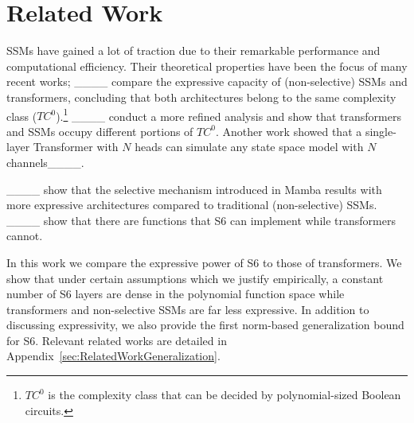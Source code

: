 \section{Related Work}
\vspace{-3pt}
SSMs have gained a lot of traction due to their remarkable performance and computational efficiency. Their theoretical properties have been the focus of many recent works; ____ compare the expressive capacity of (non-selective) SSMs and transformers, concluding that both architectures belong to the same complexity class ($TC^0$).\footnote{$TC^0$ is the complexity class that can be decided by polynomial-sized Boolean circuits.} ____ conduct a more refined analysis and show that transformers and SSMs occupy different portions of $TC^0$. Another work showed that a single-layer Transformer with $N$ heads can simulate any state space model with $N$ channels____. 
 

____ show that the selective mechanism introduced in Mamba results with more expressive architectures compared to traditional (non-selective) SSMs.
____ show that there are functions that S6 can implement while transformers cannot.

In this work we compare the expressive power of S6 to those of transformers. We show that under certain assumptions which we justify empirically, a constant number of S6 layers are dense in the polynomial function space while transformers and non-selective SSMs are far less expressive. %
%
In addition to discussing expressivity, we also provide the first norm-based generalization bound for S6. Relevant related works are detailed in Appendix~\ref{sec:RelatedWorkGeneralization}.





